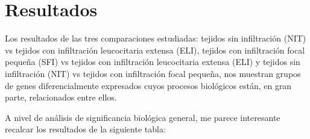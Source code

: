 \documentclass[
]{article}
\begin{document}
\newpage
\section{Resultados}

Los resultados de las tres comparaciones estudiadas: tejidos sin
infiltración (NIT) vs tejidos con infiltración leucocitaria extensa
(ELI), tejidos con infiltración focal pequeña (SFI) vs tejidos con
infiltración leucocitaria extensa (ELI) y tejidos sin infiltración (NIT)
vs tejidos con infiltración focal pequeña, nos muestran grupos de genes
diferencialmente expresados cuyos procesos biológicos están, en gran
parte, relacionados entre ellos.

A nivel de análisis de significancia biológica general, me parece
interesante recalcar los resultados de la siguiente tabla:
\end{document}
